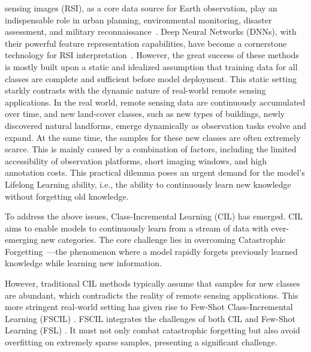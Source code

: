﻿\documentclass[letterpaper,journal]{IEEEtran}
\begin{document}
 sensing images (RSI), as a core data source for Earth observation, play an indispensable role in urban planning, environmental monitoring, disaster assessment, and military reconnaissance~\cite{cheng2017, ma2019, zhu2017grsm}. Deep Neural Networks (DNNs), with their powerful feature representation capabilities, have become a cornerstone technology for RSI interpretation~\cite{cheng2017, ma2019, zhu2017grsm}. However, the great success of these methods is mostly built upon a static and idealized assumption that training data for all classes are complete and sufficient before model deployment. This static setting starkly contrasts with the dynamic nature of real-world remote sensing applications. In the real world, remote sensing data are continuously accumulated over time, and new land-cover classes, such as new types of buildings, newly discovered natural landforms, emerge dynamically as observation tasks evolve and expand. At the same time, the samples for these new classes are often extremely scarce. This is mainly caused by a combination of factors, including the limited accessibility of observation platforms, short imaging windows, and high annotation costs. This practical dilemma poses an urgent demand for the model's Lifelong Learning ability, i.e., the ability to continuously learn new knowledge without forgetting old knowledge.

To address the above issues, Class-Incremental Learning (CIL) \cite{rebuffi2017, deLange2022, parisi2019, vandeven2019} has emerged. CIL aims to enable models to continuously learn from a stream of data with ever-emerging new categories. The core challenge lies in overcoming Catastrophic Forgetting~\cite{kirkpatrick2017}---the phenomenon where a model rapidly forgets previously learned knowledge while learning new information.

However, traditional CIL methods typically assume that samples for new classes are abundant, which contradicts the reality of remote sensing applications. This more stringent real-world setting has given rise to Few-Shot Class-Incremental Learning (FSCIL) \cite{tao2020}. FSCIL integrates the challenges of both CIL and Few-Shot Learning (FSL) \cite{snell2017, finn2017, wang2020}. It must not only combat catastrophic forgetting but also avoid overfitting on extremely sparse samples, presenting a significant challenge.
\end{document}
